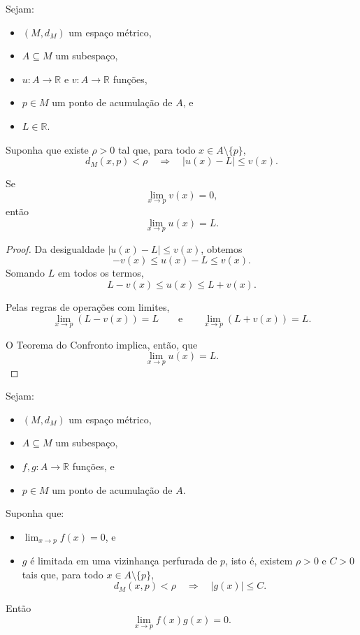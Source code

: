 \begin{corollary}
    Sejam:
    \begin{itemize}
        \item $(M,d_M)$ um espaço métrico,
        \item $A\subseteq M$ um subespaço,
        \item $u:A\to\mathbb R$ e $v:A\to\mathbb R$ funções,
        \item $p\in M$ um ponto de acumulação de $A$, e
        \item $L\in\mathbb R$.
    \end{itemize}

    Suponha que existe $\rho>0$ tal que, para todo $x\in A\setminus\{p\}$,
    \[
        d_M(x,p)<\rho
        \quad\Longrightarrow\quad
        |u(x)-L|\leq v(x).
    \]

    Se
    \[
        \lim_{x\to p}v(x)=0,
    \]
    então
    \[
        \lim_{x\to p}u(x)=L.
    \]
\end{corollary}

\begin{proof}
    Da desigualdade $|u(x)-L|\leq v(x)$, obtemos
    \[
        -v(x)\leq u(x)-L\leq v(x).
    \]
    Somando $L$ em todos os termos,
    \[
        L-v(x)\leq u(x)\leq L+v(x).
    \]

    Pelas regras de operações com limites,
    \[
        \lim_{x\to p}(L-v(x))=L
        \qquad\text{e}\qquad
        \lim_{x\to p}(L+v(x))=L.
    \]

    O Teorema do Confronto implica, então, que
    \[
        \lim_{x\to p}u(x)=L.
    \]
\end{proof}

\begin{corollary}
    Sejam:
    \begin{itemize}
        \item $(M,d_M)$ um espaço métrico,
        \item $A\subseteq M$ um subespaço,
        \item $f,g:A\to\mathbb R$ funções, e
        \item $p\in M$ um ponto de acumulação de $A$.
    \end{itemize}

    Suponha que:
    \begin{itemize}
        \item $\lim_{x\to p}f(x)=0$, e
        \item $g$ é limitada em uma vizinhança perfurada de $p$, isto é, existem $\rho>0$ e $C>0$ tais que, para todo $x\in A\setminus\{p\}$,
        \[
            d_M(x,p)<\rho
            \quad\Longrightarrow\quad
            |g(x)|\leq C.
        \]
    \end{itemize}

    Então
    \[
        \lim_{x\to p}f(x)g(x)=0.
    \]
\end{corollary}

